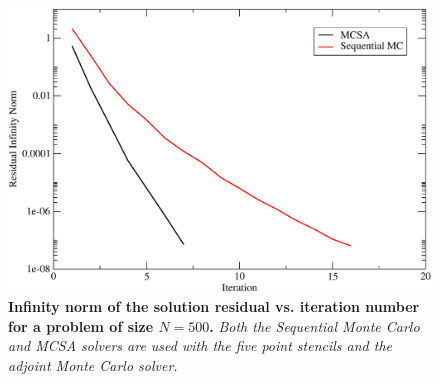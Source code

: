 \begin{figure}[t!]
  \centering
  \includegraphics[width=5in,clip]{chapters/mc_background/seq_conv_500.pdf}
  \caption{\textbf{Infinity norm of the solution residual
      vs. iteration number for a problem of size $N=500$.}
    \textit{Both the Sequential Monte Carlo and MCSA solvers are used
      with the five point stencils and the adjoint Monte Carlo
      solver.}}
  \label{fig:seq_500}
\end{figure}

\clearpage

